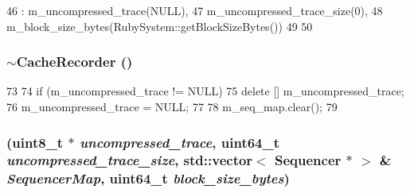 \begin{DoxyCode}
46     : m_uncompressed_trace(NULL),
47       m_uncompressed_trace_size(0),
48       m_block_size_bytes(RubySystem::getBlockSizeBytes())
49 {
50 }
\end{DoxyCode}
\hypertarget{classCacheRecorder_a68f3dcf17846371633e1febffe1d9f59}{
\subsubsection[{$\sim$CacheRecorder}]{\setlength{\rightskip}{0pt plus 5cm}$\sim${\bf CacheRecorder} ()}}
\label{classCacheRecorder_a68f3dcf17846371633e1febffe1d9f59}



\begin{DoxyCode}
73 {
74     if (m_uncompressed_trace != NULL) {
75         delete [] m_uncompressed_trace;
76         m_uncompressed_trace = NULL;
77     }
78     m_seq_map.clear();
79 }
\end{DoxyCode}
\hypertarget{classCacheRecorder_a4f7b56431467eb96301939488f742090}{
\subsubsection[{CacheRecorder}]{ (uint8\_\-t $\ast$ {\em uncompressed\_\-trace}, \/  uint64\_\-t {\em uncompressed\_\-trace\_\-size}, \/  {\bf std::vector}$<$ {\bf Sequencer} $\ast$ $>$ \& {\em SequencerMap}, \/  uint64\_\-t {\em block\_\-size\_\-bytes})}}
\label{classCacheRecorder_a4f7b56431467eb96301939488f742090}




